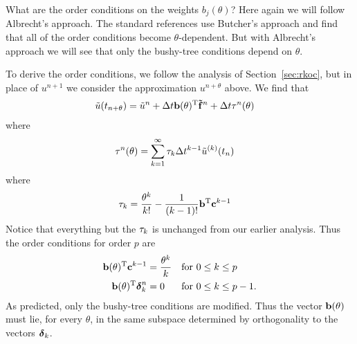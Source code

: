 \documentclass[12pt]{article}
\begin{document}
What are the order conditions on the weights $b_j(\theta)$?  Here again
we will follow Albrecht's approach.  The standard references use Butcher's
approach and find that all of the order conditions become $\theta$-dependent.
But with Albrecht's approach we will see that only the bushy-tree conditions
depend on $\theta$.

To derive the order conditions, we follow the analysis of Section~\ref{sec:rkoc},
but in place of $u^{n+1}$ we consider the approximation $u^{n+\theta}$ above.
We find that 
\begin{align*}
\tilde{u}(t_{n+\theta}) & = \tilde{u}^{n} + \Delta t \mathbf{b}(\theta)^\mathrm{T}\mathbf{\tilde{f}}^n + \Delta t \tau^n(\theta)
\end{align*}
where
\begin{align*}
\tau^n(\theta) & = \sum_{k=1}^\infty \tau_k \Delta t^{k-1} \tilde{u}^{(k)}(t_{n})
\end{align*}
where
\begin{align*}
\tau_k & = \frac{\theta^k}{k!} - \frac{1}{(k-1)!} \mathbf{b}^\mathrm{T} \mathbf{c}^{k-1}
\end{align*}
Notice that everything but the $\tau_k$ is unchanged from our earlier
analysis.  Thus the order conditions for order $p$ are
\begin{align*}    
\mathbf{b}(\theta)^\mathrm{T} \mathbf{c}^{k-1} & = \frac{\theta^k}{k}  &  \mbox{for }  & 0\le k\le p \\
\mathbf{b}(\theta)^\mathrm{T}\boldsymbol{\delta}^n_k & = 0 &  \mbox{for } & 0\le k\le p-1.
\end{align*}
As predicted, only the bushy-tree conditions are modified.
Thus the vector $\mathbf{b}(\theta)$ must lie, for every $\theta$, in the same
subspace determined by orthogonality to the vectors $\boldsymbol{\delta}_k$.



\end{document}
